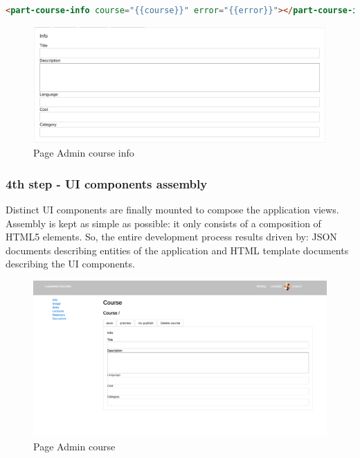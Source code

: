\begin{lstlisting}[language=html]
<part-course-info course="{{course}}" error="{{error}}"></part-course-info>
\end{lstlisting}


\begin{figure}[htb] %
 \centering
 \includegraphics[width=1.0\linewidth]{images/chapter3/admin-course-info.png}\hfill
 \caption[Page Admin course info]{Page Admin course info}
 \label{fig:fourV}
\end{figure}

\subsubsection {4th step - UI components assembly}
\label{subsec:4th_step_UI_components_assembly}

Distinct UI components are finally mounted to compose the application views. Assembly is kept as simple as possible: it only consists of a composition of HTML5 elements. So, the entire development process results driven by: JSON documents describing entities of the application and HTML template documents describing the UI components.

\begin{figure}[htb] %
 \centering
 \includegraphics[width=1.0\linewidth]{images/chapter3/admin-course.png}\hfill
 \caption[Page Admin course]{Page Admin course}
 \label{fig:fourV}
\end{figure}


